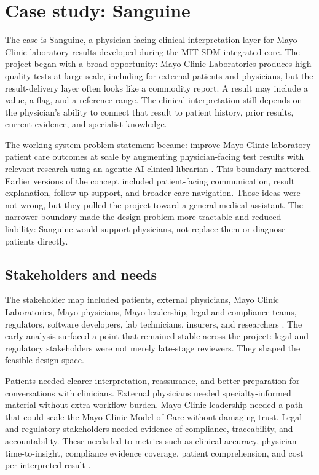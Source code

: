 \section{Case study: Sanguine}

The case is Sanguine, a physician-facing clinical interpretation layer for Mayo Clinic laboratory results developed during the MIT SDM integrated core. The project began with a broad opportunity: Mayo Clinic Laboratories produces high-quality tests at large scale, including for external patients and physicians, but the result-delivery layer often looks like a commodity report. A result may include a value, a flag, and a reference range. The clinical interpretation still depends on the physician's ability to connect that result to patient history, prior results, current evidence, and specialist knowledge.

The working system problem statement became: improve Mayo Clinic laboratory patient care outcomes at scale by augmenting physician-facing test results with relevant research using an agentic AI clinical librarian \cite{sanguine_os11,sanguine_os13}. This boundary mattered. Earlier versions of the concept included patient-facing communication, result explanation, follow-up support, and broader care navigation. Those ideas were not wrong, but they pulled the project toward a general medical assistant. The narrower boundary made the design problem more tractable and reduced liability: Sanguine would support physicians, not replace them or diagnose patients directly.

\subsection{Stakeholders and needs}

The stakeholder map included patients, external physicians, Mayo Clinic Laboratories, Mayo physicians, Mayo leadership, legal and compliance teams, regulators, software developers, lab technicians, insurers, and researchers \cite{sanguine_charter,sanguine_os9}. The early analysis surfaced a point that remained stable across the project: legal and regulatory stakeholders were not merely late-stage reviewers. They shaped the feasible design space.

Patients needed clearer interpretation, reassurance, and better preparation for conversations with clinicians. External physicians needed specialty-informed material without extra workflow burden. Mayo Clinic leadership needed a path that could scale the Mayo Clinic Model of Care without damaging trust. Legal and regulatory stakeholders needed evidence of compliance, traceability, and accountability. These needs led to metrics such as clinical accuracy, physician time-to-insight, compliance evidence coverage, patient comprehension, and cost per interpreted result \cite{sanguine_os11}.


